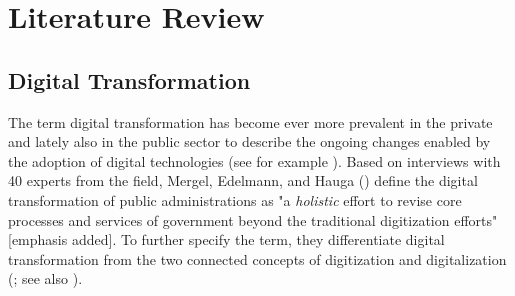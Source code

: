 \section{Literature Review}\label{Literature Review}
\subsection{Digital Transformation}\label{Digital Transformation}
The term digital transformation has become ever more prevalent in the private and lately also in the public sector to describe the ongoing changes enabled by the adoption of digital technologies (see for example \cite{McKinsey2018,BehordenSpiegel2020,Tabrizi2019}). Based on interviews with 40 experts from the field, Mergel, Edelmann, and Hauga (\cite*[p. 12]{Mergel2019a}) define the digital transformation of public administrations as "a \textit{holistic} effort to revise core processes and services of government beyond the traditional digitization efforts" [emphasis added]. To further specify the term, they differentiate digital transformation from the two connected concepts of digitization and digitalization (\cite{Mergel2019a}; see also \cite{Bloomberg2018, Brennen2015}).\par 

